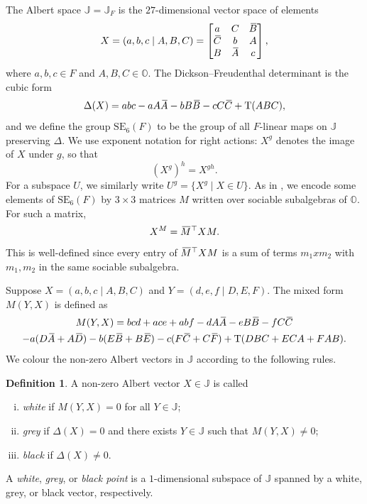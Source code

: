 \documentclass{amsart}
\def\ovA{\mathord{\mbox{\hspace*{0pt}}\,\overline{\!A\!\!\;}\!\:}\mbox{\hspace*{0pt}}}
\def\ovB{\mathord{\mbox{\hspace*{0pt}}\,\overline{\!B\!\!\;}\!\:}\mbox{\hspace*{0pt}}}
\def\ovC{\mathord{\mbox{\hspace*{0pt}}\,\overline{\!C\!\!\;}\!\:}\mbox{\hspace*{0pt}}}
\def\ovD{\mathord{\mbox{\hspace*{0pt}}\,\overline{\!D\!\!\;}\!\:}\mbox{\hspace*{0pt}}}
\def\ovE{\mathord{\mbox{\hspace*{0pt}}\,\overline{\!E\!\!\;}\!\:}\mbox{\hspace*{0pt}}}
\def\ovF{\mathord{\mbox{\hspace*{0pt}}\,\overline{\!F\!\!\;}\!\:}\mbox{\hspace*{0pt}}}
\def\ovM{\mathord{\mbox{\hspace*{0pt}}\,\overline{\!M\!\!\;}\!\:}\mbox{\hspace*{0pt}}}
\def\OO{\mathord{\mathbb{O}}}
\newcommand{\SE}{\mathrm{SE}}
\newcommand{\Tr}{\operatorname{T}}
\newcommand{\J}{\mathbb{J}}
\newcommand{\T}{\top}
\newcommand{\fdet}{\Delta}
\theoremstyle{plain}
\numberwithin{theorem}{section}
\theoremstyle{definition}
\newtheorem{definition}[theorem]{Definition}
\begin{document}
The Albert space $\J = \J_F$ is the $27$-dimensional vector space of elements
\begin{equation}
	X = (a,b,c\mid A,B,C) = \begin{bmatrix}
		a & C & \ovB \\
		\ovC & b & A \\
		B & \ovA & c
	\end{bmatrix},
\end{equation}
where $a,b,c \in F$ and $A,B,C \in \OO$. The Dickson--Freudenthal determinant is the cubic form
\begin{equation}
	\fdet(X) = abc - aA\ovA - bB\ovB - cC\ovC + \Tr(ABC),
\end{equation}
and we define the group $\SE_6(F)$ to be the group of all $F$-linear maps on $\J$
preserving $\fdet$.  We use exponent notation for right actions:
$X^g$ denotes the image of $X$ under $g$, so that
\begin{equation*}
	 (X^g)^h=X^{gh}.
\end{equation*}
For a subspace $U$, we similarly write
$U^g=\{X^g\mid X\in U\}$.  As in
\cite{BSW1}, we encode some elements of $\SE_6(F)$ by $3\times 3$
matrices $M$ written over sociable subalgebras of $\OO$.  For such a
matrix,
\begin{equation*}
	 X^M=\ovM^{\T} X M.
\end{equation*}
This is well-defined since every entry of $\ovM^{\T} X M$ is a sum of
terms $m_1 x m_2$ with $m_1,m_2$ in the same sociable subalgebra.

Suppose $X = (a,b,c \mid A,B,C)$ and $Y = (d,e,f\mid D,E,F)$. The mixed form $M(Y,X)$ is defined as
\begin{multline}
	M(Y,X) = bcd + ace + abf - d A\ovA  -e B \ovB - f C\ovC \\
	- a(D\ovA + A\ovD) - b(E\ovB + B\ovE) - c(F\ovC + C\ovF) + \Tr(DBC + ECA + FAB).
\end{multline}
We colour the non-zero Albert vectors in $\J$ according to the following rules.

\begin{definition}
	A non-zero Albert vector $X \in \J$ is called
	\begin{enumerate}[(i)]
		\item \textit{white} if $M(Y,X) = 0$ for all $Y \in \J$;
		\item \textit{grey} if $\fdet(X) = 0$ and there exists $Y \in \J$ such that
			$M(Y,X) \neq 0$;
		\item \textit{black} if $\fdet(X) \neq 0$.
	\end{enumerate}
	A \textit{white}, \textit{grey}, or \textit{black point} is a $1$-dimensional subspace
	of $\J$ spanned by a white, grey, or black vector, respectively.
\end{definition}
\end{document}
